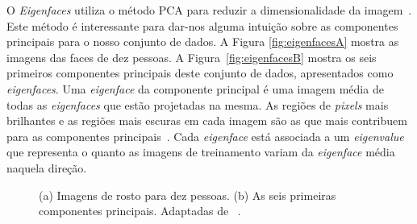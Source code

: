 	O \textit{Eigenfaces} utiliza o método PCA para reduzir a dimensionalidade da
	imagem~\cite{hewitt}. Este método é interessante para dar-nos alguma intuição
	sobre as componentes principais para o nosso conjunto de dados. A Figura
	\ref{fig:eigenfacesA} mostra as imagens das faces de dez pessoas. A
	Figura~\ref{fig:eigenfacesB} mostra os seis primeiros componentes principais
	deste conjunto de dados, apresentados como \textit{eigenfaces}. Uma
	\textit{eigenface} da componente principal é uma imagem média de todas as
	\textit{eigenfaces} que estão projetadas na mesma. As regiões de
	\textit{pixels} mais brilhantes e as regiões mais escuras em cada imagem são
	as que mais contribuem para as componentes principais~\cite{hewitt}. Cada
	\textit{eigenface} está associada a um \textit{eigenvalue} que representa o
		quanto as imagens de treinamento variam da \textit{eigenface} média naquela
	direção.
	
	\begin{figure}[htb]
		\begin{center}
		\end{center}
		\caption{ (a) Imagens de rosto para dez pessoas.
		(b) As seis primeiras componentes principais. Adaptadas de ~\cite{hewitt}.}
	\end{figure}
	
